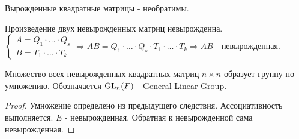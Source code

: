 \begin{corollary}
	Вырожденные квадратные матрицы - необратимы.
\end{corollary}
\begin{corollary}
	Произведение двух невырожденных матриц невырожденна. \newline 
	\(\left\{\begin{gathered}
		A = Q_1 \cdot \ldots \cdot Q_s \\
		B = T_1 \cdot \ldots \cdot T_k
	\end{gathered}\right. \Longrightarrow AB = Q_1 \cdot\ldots\cdot Q_s\cdot T_1\cdot\ldots\cdot T_k\Longrightarrow AB\) - невырожденная.
\end{corollary}
\begin{corollary}
	Множество всех невырожденных квадратных матриц \(n\times n\) образует группу по умножению. Обозначается \(\operatorname{GL}_n(F)\) - General Linear Group.
\end{corollary}
\begin{proof}
	Умножение определено из предыдущего следствия. Ассоциативность выполняется. \(E\) - невырожденная. Обратная к невырожденной сама невырожденная.
\end{proof}
